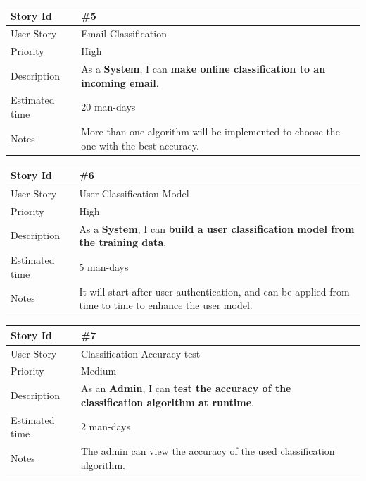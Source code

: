 \begin{tabular}{|p{3cm}|p{10cm}|}
\hline
\cellcolor[gray]{0.9} Story Id & \#5 \\ \hline
\cellcolor[gray]{0.9} User Story & Email Classification \\ \hline
\cellcolor[gray]{0.9} Priority & High\\ \hline
\cellcolor[gray]{0.9} Description & 
	As a \textbf{System}, I can \textbf{make online classification to
	an incoming email}. \\ \hline
\cellcolor[gray]{0.9} Estimated time & 20 man-days\\ \hline
\cellcolor[gray]{0.9} Notes & 
	More than one algorithm will be implemented to choose the one with 
	the best accuracy. \\ \hline
\end{tabular}

\begin{tabular}{|p{3cm}|p{10cm}|}
\hline
\cellcolor[gray]{0.9} Story Id & \#6 \\ \hline
\cellcolor[gray]{0.9} User Story & User Classification Model \\ \hline
\cellcolor[gray]{0.9} Priority & High\\ \hline
\cellcolor[gray]{0.9} Description & 
	As a \textbf{System}, I can \textbf{build a user classification 
	model from the training data}. \\ \hline
\cellcolor[gray]{0.9} Estimated time & 5 man-days\\ \hline
\cellcolor[gray]{0.9} Notes & 
	It will start after user authentication, and can be applied 
	from time to time to enhance the user model. \\ \hline
\end{tabular}

\begin{tabular}{|p{3cm}|p{10cm}|}
\hline
\cellcolor[gray]{0.9} Story Id & \#7 \\ \hline
\cellcolor[gray]{0.9} User Story & Classification Accuracy test \\ \hline
\cellcolor[gray]{0.9} Priority & Medium \\ \hline
\cellcolor[gray]{0.9} Description & 
	As an \textbf{Admin}, I can \textbf{test the accuracy of the 
	classification algorithm at runtime}. \\ \hline
\cellcolor[gray]{0.9} Estimated time & 2 man-days\\ \hline
\cellcolor[gray]{0.9} Notes & 
	The admin can view the accuracy of the used classification algorithm. \\ \hline
\end{tabular}

